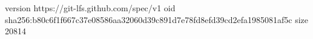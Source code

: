 version https://git-lfs.github.com/spec/v1
oid sha256:b80c6f1f667c37e08586aa32060d39c891d7e78fd8efd39cd2efa1985081af5c
size 20814
